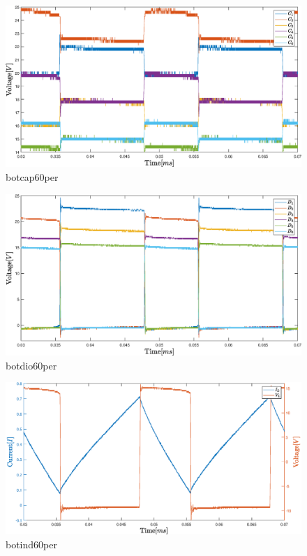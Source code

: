 \begin{figure}[H]
	\begin{center}
   \includegraphics[width=\textwidth]{figures/06Testing/botcap60per.eps}
	\end{center}
	\vspace{-8mm}
	\caption{botcap60per}
	\label{fig:V_OUT_ALL}
\end{figure}
\begin{figure}[H]
	\begin{center}
   \includegraphics[width=\textwidth]{figures/06Testing/botdio60per.eps}
	\end{center}
	\vspace{-8mm}
	\caption{botdio60per}
	\label{fig:V_OUT_ALL}
\end{figure}
\begin{figure}[H]
	\begin{center}
   \includegraphics[width=\textwidth]{figures/06Testing/botind60per.eps}
	\end{center}
	\vspace{-8mm}
	\caption{botind60per}
	\label{fig:V_OUT_ALL}
\end{figure}
